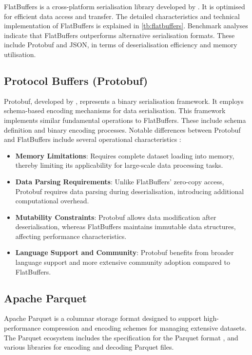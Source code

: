 FlatBuffers is a cross-platform serialisation library developed by \citet{google_flatbuffers}.
It is optimised for efficient data access and transfer.
The detailed characteristics and technical implementation of FlatBuffers is explained in \autoref{tb:flatbuffers}.
Benchmark analyses \citep{flatbuffers_benchmark} indicate that FlatBuffers outperforms alternative serialisation formats.
These include Protobuf \citep{protobuf} and JSON, in terms of deserialisation efficiency and memory utilisation.

\subsection{Protocol Buffers (Protobuf)}
\label{rw:non_geospatial_formats:protobuf}

Protobuf, developed by \citet{protobuf}, represents a binary serialisation framework.
It employs schema-based encoding mechanisms for data serialisation.
This framework implements similar fundamental operations to FlatBuffers.
These include schema definition and binary encoding processes.
Notable differences between Protobuf and FlatBuffers include several operational characteristics \citep{protobuf}:
\begin{itemize}
  \item \textbf{Memory Limitations}: Requires complete dataset loading into memory, thereby limiting its applicability for large-scale data processing tasks.
  \item \textbf{Data Parsing Requirements}: Unlike FlatBuffers' zero-copy access, Protobuf requires data parsing during deserialisation, introducing additional computational overhead.
  \item \textbf{Mutability Constraints}: Protobuf allows data modification after deserialisation, whereas FlatBuffers maintains immutable data structures, affecting performance characteristics.
  \item \textbf{Language Support and Community}: Protobuf benefits from broader language support and more extensive community adoption compared to FlatBuffers.
\end{itemize}

\subsection{Apache Parquet}
\label{rw:non_geospatial_formats:parquet}

Apache Parquet \citep{parquet} is a columnar storage format designed to support high-performance compression and encoding schemes for managing extensive datasets.
The Parquet ecosystem includes the specification for the Parquet format \citep{parquet-format}, and various libraries for encoding and decoding Parquet files.

